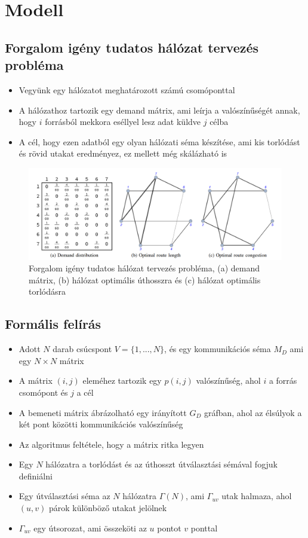 \documentclass[12pt]{report}
\begin{document}
\chapter{Modell}

\section{Forgalom igény tudatos hálózat tervezés probléma}

\begin{itemize}
	\item Vegyünk egy hálózatot meghatározott számú csomóponttal
	\item A hálózathoz tartozik egy demand mátrix, ami leírja a valószínűségét annak, hogy $i$ forrásból mekkora eséllyel lesz adat küldve $j$ célba
	\item A cél, hogy ezen adatból egy olyan hálózati séma készítése, ami kis torlódást és rövid utakat eredményez, ez mellett még skálázható is
\end{itemize}

\begin{figure}[h]
	\centering
	\includegraphics[width=14cm]{pictures/example.png}
	\caption{Forgalom igény tudatos hálózat tervezés probléma, (a) demand mátrix, (b) hálózat optimális úthosszra és (c) hálózat optimális torlódásra}
	\label{network-strategies}
\end{figure}

\section{Formális felírás}

\begin{itemize}
	\item Adott $N$ darab csúcspont  $V = \{1, ..., N\}$, és egy kommunikációs séma $M_D$ ami egy $N\times N$ mátrix
	\item A mátrix $(i, j)$ eleméhez tartozik egy $p(i, j)$ valószínűség, ahol $i$ a forrás csomópont és $j$ a cél
	\item A bemeneti mátrix ábrázolható egy irányított
	$G_D$ gráfban, ahol az élsúlyok a két pont közötti kommunikációs valószínűség
	\item Az algoritmus feltétele, hogy a mátrix ritka legyen
	\item Egy $N$ hálózatra a torlódást és az úthosszt útválasztási sémával fogjuk definiálni
	\item Egy útválasztási séma az $N$ hálózatra $\Gamma(N)$, ami $\Gamma_{uv}$ utak halmaza, ahol $(u, v)$ párok különböző utakat jelölnek
	\item $\Gamma_{uv}$ egy útsorozat, ami összeköti az $u$ pontot $v$ ponttal
\end{itemize}
\end{document}
